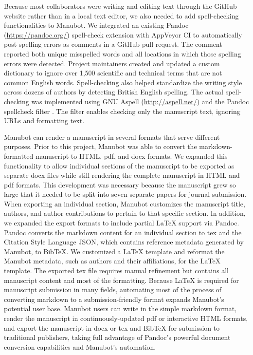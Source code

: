 \documentclass[sigconf]{acmart}
\begin{document}
Because most collaborators were writing and editing text through the GitHub website rather than in a local text editor, we also needed to add spell-checking functionalities to Manubot.
We integrated an existing Pandoc (\url{https://pandoc.org/}) spell-check extension with AppVeyor CI to automatically post spelling errors as comments in a GitHub pull request.
The comment reported both unique misspelled words and all locations in which those spelling errors were detected.
Project maintainers created and updated a custom dictionary to ignore over 1,500 scientific and technical terms that are not common English words.
Spell-checking also helped standardize the writing style across dozens of authors by detecting British English spelling.
The actual spell-checking was implemented using GNU Aspell (\url{http://aspell.net/}) and the Pandoc spellcheck filter \citep{nTjoZqSQ}.
The filter enables checking only the manuscript text, ignoring URLs and formatting text.

Manubot can render a manuscript in several formats that serve different purposes.
Prior to this project, Manubot was able to convert the markdown-formatted manuscript to HTML, pdf, and docx formats.
We expanded this functionality to allow individual sections of the manuscript to be exported as separate docx files while still rendering the complete manuscript in HTML and pdf formats.
This development was necessary because the manuscript grew so large that it needed to be split into seven separate papers for journal submission.
When exporting an individual section, Manubot customizes the manuscript title, authors, and author contributions to pertain to that specific section.
In addition, we expanded the export formats to include partial LaTeX support via Pandoc.
Pandoc converts the markdown content for an individual section to tex and the Citation Style Language JSON, which contains reference metadata generated by Manubot, to BibTeX.
We customized a LaTeX template and reformat the Manubot metadata, such as authors and their affiliations, for the LaTeX template.
The exported tex file requires manual refinement but contains all manuscript content and most of the formatting.
Because LaTeX is required for manuscript submission in many fields, automating most of the process of converting markdown to a submission-friendly format expands Manubot's potential user base.
Manubot users can write in the simple markdown format, render the manuscript in continuously-updated pdf or interactive HTML formats, and export the manuscript in docx or tex and BibTeX for submission to traditional publishers, taking full advantage of Pandoc's powerful document conversion capabilities and Manubot's automation.
\end{document}
